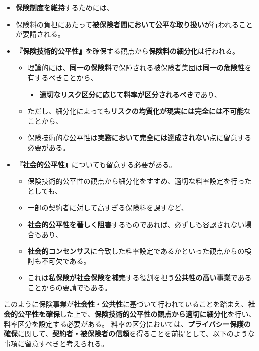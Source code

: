 \documentclass[]{article}
\begin{document}
\begin{itemize}
\item
  \textbf{保険制度を維持}するためには、
\item
  保険料の負担にあたって\textbf{被保険者間において公平な取り扱い}が行われることが要請される。
\item
  \textbf{『保険技術的公平性』}を確保する観点から\textbf{保険料の細分化}は行われる。

  \begin{itemize}
  \tightlist
  \item
    理論的には、\textbf{同一の保険料}で保障される被保険者集団は\textbf{同一の危険性}を有するべきことから、

    \begin{itemize}
    \tightlist
    \item
      \textbf{適切なリスク区分に応じて料率が区分されるべき}であり、
    \end{itemize}
  \item
    ただし、細分化によっても\textbf{リスクの均質化が現実には完全には不可能}なことから、
  \item
    保険技術的な公平性は\textbf{実務において完全には達成されない}点に留意する必要がある。
  \end{itemize}
\item
  \textbf{『社会的公平性』}についても留意する必要がある。

  \begin{itemize}
  \tightlist
  \item
    保険技術的公平性の観点から細分化をすすめ、適切な料率設定を行ったとしても、
  \item
    一部の契約者に対して高すぎる保険料を課すなど、
  \item
    \textbf{社会的公平性を著しく阻害}するものであれば、必ずしも容認されない場合もあり、
  \item
    \textbf{社会的コンセンサス}に合致した料率設定であるかといった観点からの検討も不可欠である。
  \item
    これは\textbf{私保険が社会保険を補完}する役割を担う\textbf{公共性の高い事業}であることからの要請でもある。
  \end{itemize}
\end{itemize}

このように保険事業が\textbf{社会性・公共性}に基づいて行われていることを踏まえ、\textbf{社会的公平性を確保}した上で、\textbf{保険技術的公平性の観点から適切に細分化}を行い、料率区分を設定する必要がある。
料率の区分においては、\textbf{プライバシー保護の確保}に関して、\textbf{契約者・被保険者の信頼}を得ることを前提として、以下のような事項に留意すべきと考えられる。
\end{document}
